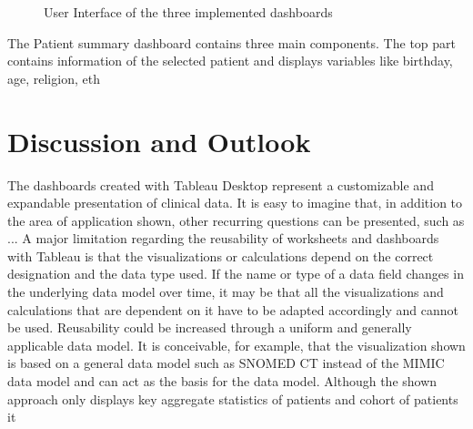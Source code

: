 \documentclass[aac,crcready]{iosart2x}
\begin{document}
\begin{figure}[ht]
\begin{minipage}[b]{\linewidth}
   \end{minipage}%
   \caption{User Interface of the three implemented dashboards}\label{fig:overviewdashboard} 
\end{figure} 

The Patient summary dashboard contains three main components. The top part contains information of the selected patient and displays variables like birthday, age, religion, eth

\section{Discussion and Outlook}\label{s5}
The dashboards created with Tableau Desktop represent a customizable and expandable presentation of clinical data. It is easy to imagine that, in addition to the area of application shown, other recurring questions can be presented, such as ...
A major limitation regarding the reusability of worksheets and dashboards with Tableau is that the visualizations or calculations depend on the correct designation and the data type used. If the name or type of a data field changes in the underlying data model over time, it may be that all the visualizations and calculations that are dependent on it have to be adapted accordingly and cannot be used. Reusability could be increased through a uniform and generally applicable data model. It is conceivable, for example, that the visualization shown is based on a general data model such as SNOMED CT instead of the MIMIC data model and can act as the basis for the data model.
Although the shown approach only displays key aggregate statistics of patients and cohort of patients it 



\end{document}
